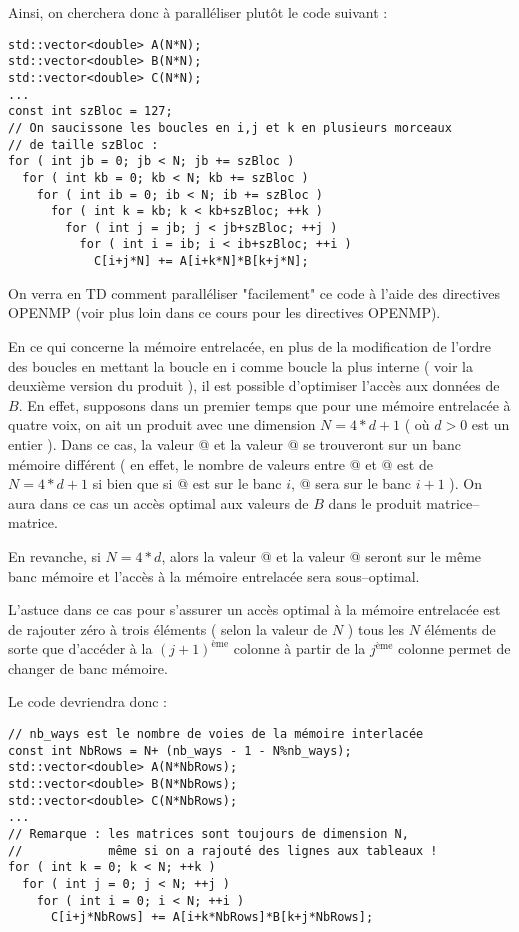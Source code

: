 \documentclass[fleqn,11pt]{article}
\begin{document}
Ainsi, on cherchera donc à paralléliser plutôt le code suivant :
\begin{lstlisting}
std::vector<double> A(N*N);
std::vector<double> B(N*N);
std::vector<double> C(N*N);
...
const int szBloc = 127;
// On saucissone les boucles en i,j et k en plusieurs morceaux 
// de taille szBloc :
for ( int jb = 0; jb < N; jb += szBloc )
  for ( int kb = 0; kb < N; kb += szBloc )
    for ( int ib = 0; ib < N; ib += szBloc )
      for ( int k = kb; k < kb+szBloc; ++k )
        for ( int j = jb; j < jb+szBloc; ++j )
          for ( int i = ib; i < ib+szBloc; ++i )
            C[i+j*N] += A[i+k*N]*B[k+j*N];
\end{lstlisting}

On verra en TD comment paralléliser "facilement" ce code à l'aide des directives OPENMP (voir plus loin dans ce cours pour les directives OPENMP).

En ce qui concerne la mémoire entrelacée, en plus de la modification de l'ordre des boucles en mettant la boucle en i comme boucle la plus interne ( voir la deuxième version du produit ), 
il est possible d'optimiser l'accès aux données de $B$. En effet, supposons dans un premier temps
que pour une mémoire entrelacée à quatre voix, on ait un produit avec une dimension $N=4*d+1$ ( où $d>0$ est un entier ).
Dans ce cas, la valeur \lstinline@B[k+j*N]@ et la valeur \lstinline@B[k+(j+1)*N]@ se trouveront sur un banc mémoire différent ( en effet, le nombre de valeurs entre  \lstinline@B[k+j*N]@ et \lstinline@B[k+(j+1)*N]@ est de $N=4*d+1$ si bien que si \lstinline@B[k+j*N]@ est sur le banc $i$, \lstinline@B[k+(j+1)*N]@ sera sur le banc $i+1$ ). On aura dans ce cas un accès optimal aux valeurs de $B$ dans le produit matrice--matrice.

En revanche, si $N=4*d$, alors la valeur \lstinline@B[k+j*N]@ et la valeur \lstinline@B[k+(j+1)*N]@ seront sur le même banc mémoire et l'accès à la mémoire entrelacée sera sous--optimal.

L'astuce dans ce cas pour s'assurer un accès optimal à la mémoire entrelacée est de rajouter zéro à trois éléments ( selon la valeur de $N$ ) tous les $N$ éléments de sorte que d'accéder à la $(j+1)^{\mbox{ème}}$ colonne à partir de la  $j^{\mbox{ème}}$ colonne permet de changer de banc mémoire.

Le code devriendra donc :
\begin{lstlisting}
// nb_ways est le nombre de voies de la mémoire interlacée
const int NbRows = N+ (nb_ways - 1 - N%nb_ways);
std::vector<double> A(N*NbRows);
std::vector<double> B(N*NbRows);
std::vector<double> C(N*NbRows);
...
// Remarque : les matrices sont toujours de dimension N,
//            même si on a rajouté des lignes aux tableaux !
for ( int k = 0; k < N; ++k )
  for ( int j = 0; j < N; ++j )
    for ( int i = 0; i < N; ++i )
      C[i+j*NbRows] += A[i+k*NbRows]*B[k+j*NbRows];
\end{lstlisting}
\end{document}
